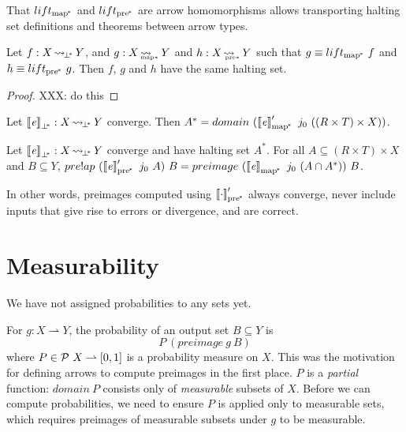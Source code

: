 \documentclass[preprint]{sigplanconf}
\newcommand{\arrow}{\rightsquigarrow}
\newcommand{\pto}{\rightharpoonup}
\newcommand{\arrowlift}{\ensuremath{lift}}
\newcommand{\pbot}{{\bot^{\mspace{-4mu}*}}}
\DeclareMathOperator{\pbotto}{\arrow_{\mspace{-3mu}\pbot}}
\newcommand{\pmap}{_\mathrm{map^{\mspace{-2mu}*}}}
\DeclareMathOperator{\pmapto}{\arrow_{\mspace{-22mu}_{\mathrm{map*}}}}
\newcommand{\liftpmap}{\arrowlift\pmap}
\newcommand{\ppre}{_\mathrm{pre^{\mspace{-2mu}*}}}
\DeclareMathOperator{\ppreto}{\arrow_{\mspace{-19mu}_{\mathrm{pre*}}}}
\newcommand{\liftppre}{\arrowlift\ppre}
\begin{document}
That $\liftpmap$ and $\liftppre$ are arrow homomorphisms allows transporting halting set definitions and theorems between arrow types.

\begin{theorem}
Let $f : X \pbotto Y$, and $g : X \pmapto Y$ and $h : X \ppreto Y$ such that $g \equiv \liftpmap~f$ and $h \equiv \liftppre~g$.
Then $f$, $g$ and $h$ have the same halting set.
\end{theorem}
\begin{proof}
XXX: do this
\end{proof}

\begin{corollary}
Let $\meaningof{\mathit{e}}_\pbot : X \pbotto Y$ converge.
Then $A^* = domain~(\meaningof{\mathit{e}}\pmap'~j_0~((R \times T) \times X))$.
\end{corollary}

\begin{corollary}
Let $\meaningof{\mathit{e}}_\pbot : X \pbotto Y$ converge and have halting set $A^*$.
For all $A \subseteq (R \times T) \times X$ and $B \subseteq Y$, $pre!ap~(\meaningof{\mathit{e}}\ppre'~j_0~A)~B = preimage~(\meaningof{\mathit{e}}\pmap~j_0~(A \i A^*))~B$.
\end{corollary}

In other words, preimages computed using $\meaningof{\cdot}\ppre'$ always converge, never include inputs that give rise to errors or divergence, and are correct.

\section{Measurability}
\label{sec:measurability}

We have not assigned probabilities to any sets yet.

For $g : X \pto Y$, the probability of an output set $B \subseteq Y$ is
\begin{equation}
	P~(preimage~g~B)
\end{equation}
where $P \in \powerset~X \pto [0,1]$ is a probability measure on $X$.
This was the motivation for defining arrows to compute preimages in the first place.
$P$ is a \emph{partial} function: $domain~P$ consists only of \emph{measurable} subsets of $X$.
Before we can compute probabilities, we need to ensure $P$ is applied only to measurable sets, which requires preimages of measurable subsets under $g$ to be measurable.
\end{document}
